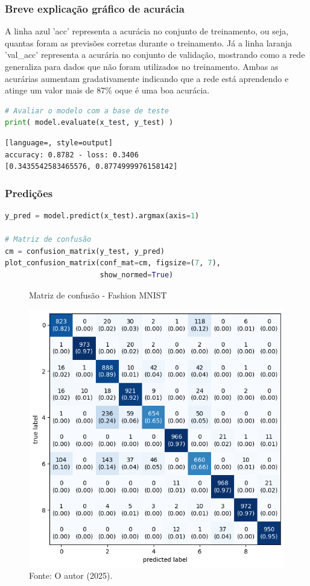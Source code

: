 \subsubsection*{Breve explicação gráfico de acurácia}
A linha azul 'acc' representa a acurácia no conjunto de treinamento, ou seja, quantas foram as previsões corretas durante o treinamento. Já a linha laranja 'val\_acc' representa a acurária no conjunto de validação, mostrando como a rede generaliza para dados que não foram utilizados no treinamento. Ambas as acurárias aumentam gradativamente indicando que a rede está aprendendo e atinge um valor mais de 87\% oque é uma boa acurácia.
\begin{lstlisting}[language=Python, style=input]
# Avaliar o modelo com a base de teste
print( model.evaluate(x_test, y_test) )
\end{lstlisting}
\begin{lstlisting}[language=, style=output]
accuracy: 0.8782 - loss: 0.3406
[0.3435542583465576, 0.8774999976158142]
\end{lstlisting}
\subsubsection*{Predições}
\begin{lstlisting}[language=Python, style=input]
y_pred = model.predict(x_test).argmax(axis=1)

# Matriz de confusão
cm = confusion_matrix(y_test, y_pred)
plot_confusion_matrix(conf_mat=cm, figsize=(7, 7),
                      show_normed=True)
\end{lstlisting}
\begin{figure}[H]
\centering
\caption{Matriz de confusão - Fashion MNIST}
\includegraphics[width=.8\linewidth]{apendices/fig/13_IAA012_3.png}
\caption*{Fonte: O autor (2025).}
\end{figure}
